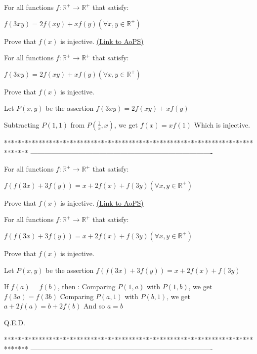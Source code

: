 \begin{problem}
	For all functions $f:\mathbb{R}^{+} \to \mathbb{R}^{+}$ that satisfy:

$f(3xy)=2f(xy)+xf(y) (\forall x,y \in \mathbb{R}^{+})$

Prove that $f(x)$ is injective.
	\flushright \href{https://artofproblemsolving.com/community/c6h1620557}{(Link to AoPS)}
\end{problem}



\begin{solution}
	\begin{tcolorbox}For all functions $f:\mathbb{R}^{+} \to \mathbb{R}^{+}$ that satisfy:

$f(3xy)=2f(xy)+xf(y) (\forall x,y \in \mathbb{R}^{+})$

Prove that $f(x)$ is injective.\end{tcolorbox}
Let $P(x,y)$ be the assertion $f(3xy)=2f(xy)+xf(y)$

Subtracting $P(1,1)$ from $P(\frac 1x,x)$, we get $f(x)=xf(1)$
Which is injective.



\end{solution}
*******************************************************************************
-------------------------------------------------------------------------------

\begin{problem}
	For all functions $f:\mathbb{R}^{+} \to \mathbb{R}^{+}$ that satisfy:

$f(f(3x)+3f(y))=x+2f(x)+f(3y) (\forall x,y \in \mathbb{R}^{+})$

Prove that $f(x)$ is injective.
	\flushright \href{https://artofproblemsolving.com/community/c6h1620558}{(Link to AoPS)}
\end{problem}



\begin{solution}
	\begin{tcolorbox}For all functions $f:\mathbb{R}^{+} \to \mathbb{R}^{+}$ that satisfy:

$f(f(3x)+3f(y))=x+2f(x)+f(3y) (\forall x,y \in \mathbb{R}^{+})$

Prove that $f(x)$ is injective.\end{tcolorbox}
Let $P(x,y)$ be the assertion $f(f(3x)+3f(y))=x+2f(x)+f(3y)$

If $f(a)=f(b)$, then :
Comparing $P(1,a)$ with $P(1,b)$, we get $f(3a)=f(3b)$
Comparing $P(a,1)$ with $P(b,1)$, we get $a+2f(a)=b+2f(b)$
And so $a=b$

Q.E.D.


\end{solution}
*******************************************************************************
-------------------------------------------------------------------------------

